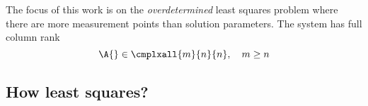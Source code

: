 The focus of this work is on the {\it{overdetermined}} least squares problem where there are more measurement points than solution parameters. The system has full column rank
$$
  \A{} \in \cmplxall{m}{n}{n}, \quad m \ge n
$$
%



\subsection{How least squares?}


\endinput